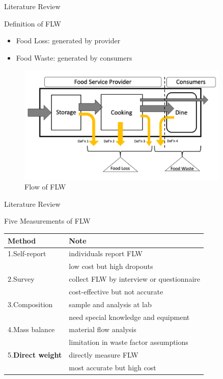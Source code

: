 \documentclass[
  ignorenonframetext,
]{beamer}
\providecommand{\tightlist}{%
  \setlength{\itemsep}{0pt}\setlength{\parskip}{0pt}}
\begin{document}
\begin{frame}{Literature Review}
\protect\hypertarget{literature-review-4}{}
\begin{block}{Definition of FLW}
\protect\hypertarget{definition-of-flw-3}{}
\begin{itemize}
\tightlist
\item
  Food Loss: generated by provider
\item
  Food Waste: generated by consumers
\end{itemize}

\begin{figure}
\centering
\includegraphics[width=0.9\textwidth,height=\textheight]{defnFLW.png}
\caption{Flow of FLW}
\end{figure}
\end{block}
\end{frame}

\begin{frame}{Literature Review}
\protect\hypertarget{literature-review-5}{}
\begin{block}{Five Measurements of FLW}
\protect\hypertarget{five-measurements-of-flw}{}
\begin{longtable}[]{@{}ll@{}}
\toprule()
Method & Note \\
\midrule()
\endhead
1.Self-report & individuals report FLW \\
& low cost but high dropouts \\
2.Survey & collect FLW by interview or questionnaire \\
& cost-effective but not accurate \\
3.Composition & sample and analysis at lab \\
& need special knowledge and equipment \\
4.Mass balance & material flow analysis \\
& limitation in waste factor assumptions \\
5.\textbf{Direct weight} & directly measure FLW \\
& most accurate but high cost \\
\bottomrule()
\end{longtable}
\end{block}
\end{frame}
\end{document}

